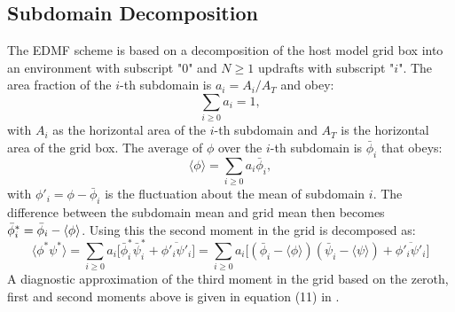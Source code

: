 \documentclass{report}
\begin{document}
\subsection{Subdomain Decomposition} \label{sec:Subdomain Decomposition}
The EDMF scheme is based on a decomposition of the host model grid box  into an environment with subscript "$0$" and $N \ge 1$ updrafts with subscript "$i$". The area fraction of the $i$-th subdomain is $a_i=A_i/A_T$ and obey:
\begin{equation}
\sum_{i\ge 0} a_i = 1,
\label{eq:area_fraction}
\end{equation}
with $A_i$ as the horizontal area of the $i$-th subdomain and $A_T$ is the horizontal area of the grid box. The average of $\phi$ over the $i$-th subdomain is $\bar{\phi}_i$ that obeys:
\begin{equation}
\langle \phi \rangle = \sum_{i\ge 0} a_i \bar{\phi}_i,
\label{eq:subdomain_mean}
\end{equation}
with $\phi'_i = \phi - \bar{\phi}_i$ is the fluctuation about the mean of subdomain $i$. The difference between the subdomain mean and grid mean then becomes $\Bar{\phi}^*_i = \bar{\phi}_i - \langle\phi \rangle$. Using this the second moment in the grid is decomposed as:
\begin{equation}
\langle \phi^* \psi^* \rangle =  
\sum_{i\ge 0} a_i\Big[\bar{\phi}^*_i\bar{\psi}^*_i + \overline{\phi'_i\psi'_i} \Big]  = \sum_{i\ge 0} a_i\Big[(\bar{\phi}_i - \langle\phi\rangle)(\bar{\psi}_i - \langle\psi\rangle) + \overline{\phi'_i\psi'_i} \Big]
\label{eq:second_moment_decomposition}
\end{equation}
A diagnostic approximation of the third moment in the grid based on the zeroth, first and second moments above is given in equation (11) in \cite{cohen_2020}.
\end{document}
